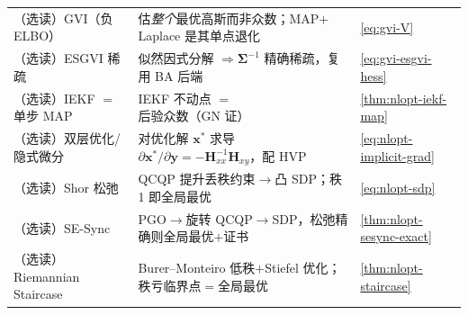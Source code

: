 \begin{table}[H]
\begin{tabular}{lll}
（选读）GVI（负 ELBO） & 估\emph{整个}最优高斯而非众数；MAP$+$Laplace 是其单点退化 & \cref{eq:gvi-V} \\
（选读）ESGVI 稀疏 & 似然因式分解 $\Rightarrow\boldsymbol{\Sigma}^{-1}$ 精确稀疏，复用 BA 后端 & \cref{eq:gvi-esgvi-hess} \\
（选读）IEKF $=$ 单步 MAP & IEKF 不动点 $=$ 后验众数（GN 证） & \cref{thm:nlopt-iekf-map} \\
（选读）双层优化/隐式微分 & 对优化解 $\mathbf{x}^*$ 求导 $\partial\mathbf{x}^*/\partial\mathbf{y}=-\mathbf{H}_{xx}^{-1}\mathbf{H}_{xy}$，配 HVP & \cref{eq:nlopt-implicit-grad} \\
（选读）Shor 松弛 & QCQP 提升丢秩约束$\to$凸 SDP；秩 1 即全局最优 & \cref{eq:nlopt-sdp} \\
（选读）SE-Sync & PGO$\to$旋转 QCQP$\to$SDP，松弛精确则全局最优$+$证书 & \cref{thm:nlopt-sesync-exact} \\
（选读）Riemannian Staircase & Burer--Monteiro 低秩$+$Stiefel 优化；秩亏临界点$=$全局最优 & \cref{thm:nlopt-staircase} \\
\bottomrule
\end{tabular}
\end{table}

